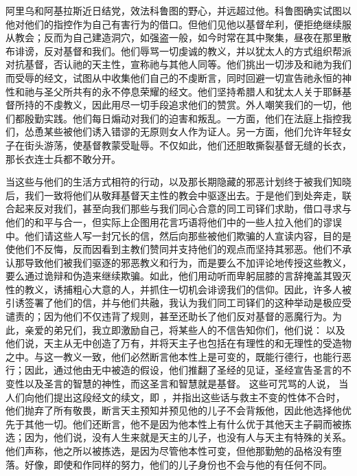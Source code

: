 阿里乌和阿基拉斯近日结党，效法科鲁图的野心，并远超过他。科鲁图确实试图以他对他们的指控作为自己有害行为的借口。但他们见他以基督牟利，便拒绝继续服从教会；反而为自己建造洞穴，如强盗一般，如今时常在其中聚集，昼夜在那里散布诽谤，反对基督和我们。他们辱骂一切虔诚的教义，并以犹太人的方式组织帮派对抗基督，否认祂的天主性，宣称祂与其他人同等。他们挑出一切涉及和祂为我们而受辱的经文，试图从中收集他们自己的不虔断言，同时回避一切宣告祂永恒的神性和祂与圣父所共有的永不停息荣耀的经文。他们坚持希腊人和犹太人关于耶稣基督所持的不虔教义，因此用尽一切手段追求他们的赞赏。外人嘲笑我们的一切，他们都殷勤实践。他们每日煽动对我们的迫害和叛乱。一方面，他们在法庭上指控我们，怂恿某些被他们诱入错谬的无原则女人作为证人。另一方面，他们允许年轻女子在街头游荡，使基督教蒙受耻辱。不仅如此，他们还胆敢撕裂基督无缝的长衣，那长衣连士兵都不敢分开。\par

当这些与他们的生活方式相符的行动，以及那长期隐藏的邪恶计划终于被我们知晓后，我们一致将他们从敬拜基督天主性的教会中驱逐出去。于是他们到处奔走，联合起来反对我们，甚至向我们那些与我们同心合意的同工司铎们求助，借口寻求与他们的和平与合一，但实际上企图用花言巧语将他们中的一些人拉入他们的谬误中。他们请这些人写一封冗长的信，然后向那些被他们欺骗的人宣读内容，目的是使他们不反悔，反而因看到主教们赞同并支持他们的观点而坚持其邪恶。他们不承认那导致他们被我们驱逐的邪恶教义和行为，而是要么不加评论地传授这些教义，要么通过诡辩和伪造来继续欺骗。如此，他们用动听而卑躬屈膝的言辞掩盖其毁灭性的教义，诱捕粗心大意的人，并抓住一切机会诽谤我们的信仰。因此，许多人被引诱签署了他们的信，并与他们共融，我认为我们同工司铎们的这种举动是极应受谴责的；因为他们不仅违背了规则，甚至还助长了他们反对基督的恶魔行为。为此，亲爱的弟兄们，我立即激励自己，将某些人的不信告知你们，他们说： 以及  他们说，天主从无中创造了万有，并将天主子也包括在有理性的和无理性的受造物之中。与这一教义一致，他们必然断言他本性上是可变的，既能行德行，也能行恶行；因此，通过他由无中被造的假设，他们推翻了圣经的见证，圣经宣告圣言的不变性以及圣言的智慧的神性，而这圣言和智慧就是基督。 这些可咒骂的人说， 当人们向他们提出这段经文的续文，即 ，并指出这些话与救主不变的性体不合时，他们抛弃了所有敬畏，断言天主预知并预见他的儿子不会背叛他，因此他选择他优先于其他一切。他们还断言，他不是因为他本性上有什么优于其他天主子嗣而被拣选；因为，他们说，没有人生来就是天主的儿子，也没有人与天主有特殊的关系。他们声称，他之所以被拣选，是因为尽管他本性可变，但他那勤勉的品格没有堕落。好像，即使和作同样的努力，他们的儿子身份也不会与他的有任何不同。\par

